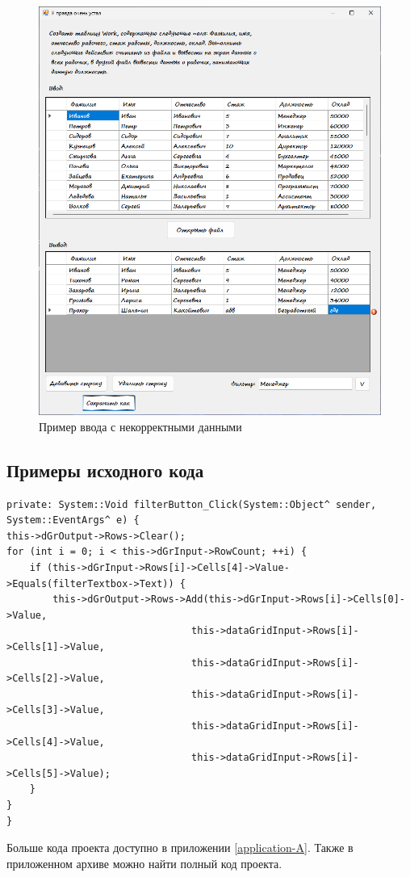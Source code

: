 \begin{figure}
\centering
\includegraphics[width=0.5\linewidth]{images//file-dialogs/error2.png}
\caption{Пример ввода с некорректными данными}
\label{fig:file-dialogs-error2}
\end{figure}


\subsection{Примеры исходного кода}
\begin{verbatim}
private: System::Void filterButton_Click(System::Object^ sender, System::EventArgs^ e) {
this->dGrOutput->Rows->Clear();
for (int i = 0; i < this->dGrInput->RowCount; ++i) {
    if (this->dGrInput->Rows[i]->Cells[4]->Value->Equals(filterTextbox->Text)) {
        this->dGrOutput->Rows->Add(this->dGrInput->Rows[i]->Cells[0]->Value,
                                this->dataGridInput->Rows[i]->Cells[1]->Value,
                                this->dataGridInput->Rows[i]->Cells[2]->Value,
                                this->dataGridInput->Rows[i]->Cells[3]->Value,
                                this->dataGridInput->Rows[i]->Cells[4]->Value,
                                this->dataGridInput->Rows[i]->Cells[5]->Value);
    }
}
}
\end{verbatim}

Больше кода проекта доступно в приложении \ref{application-A}. Также в приложенном архиве можно найти полный код проекта.